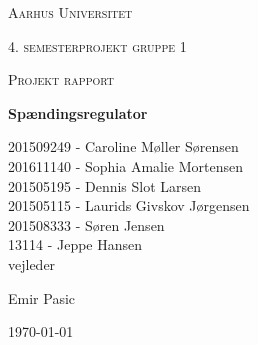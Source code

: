 \thispagestyle{empty}
	{\centering
	{\scshape\LARGE Aarhus Universitet \par}
	\vspace{1cm}
	{\scshape\Large 4. semesterprojekt gruppe 1\par}
	{\scshape\Large Projekt rapport\par}
	\vspace{1.5cm}
	{\huge\bfseries Spændingsregulator\par}
	\vspace{2cm}
	{\Large
	201509249 - Caroline Møller Sørensen\\
	201611140 - Sophia Amalie Mortensen\\
	201505195 - Dennis Slot Larsen \\
	201505115 - Laurids Givskov Jørgensen\\
	201508333 - Søren Jensen\\
	13114 - Jeppe Hansen\\   }
	\vfill
	vejleder\par
	Emir Pasic

	\vfill

	{\large \today\par}
\par}


